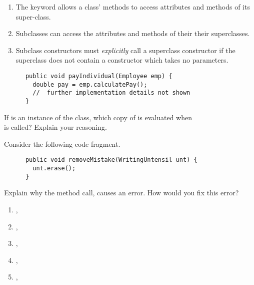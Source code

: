 

\def\AssignmentCourse{AP Computer Science A}
\def\AssignmentNumber{08}
\def\AssignmentTitle{Class Inheritance}


  \begin{questions}
    \begin{enumerate}[label=\texttt{\alph*.}]
      \item The  keyword allows a class' methods to access attributes and methods of its super-class.
      \item Subclasses can access the  attributes and methods of their their superclasses.
      \item Subclass constructors must \emph{explicitly} call a superclass constructor if the superclass does not contain a constructor which takes no parameters.
    \end{enumerate}

    \begin{lstlisting}
      public void payIndividual(Employee emp) {
        double pay = emp.calculatePay();
        //  further implementation details not shown
      }
    \end{lstlisting}
    If  is an instance of the  class, which copy of  is evaluated when\\[0pt]
     is called? Explain your reasoning.

     Consider the following code fragment.
    \begin{lstlisting}
      public void removeMistake(WritingUntensil unt) {
        unt.erase();
      }
    \end{lstlisting}

    Explain why the method call,  causes an error. How would you fix this error?

    \begin{enumerate}
      \item {}, 
      \item {}, 
      \item {}, 
      \item {}, 
      \item {}, 
    \end{enumerate}


\end{questions}
